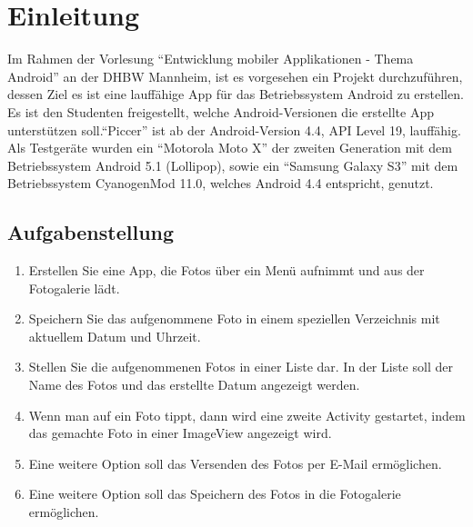 
\chapter{Einleitung}


Im Rahmen der Vorlesung \enquote{Entwicklung mobiler Applikationen - Thema Android} an der DHBW Mannheim, ist es vorgesehen ein Projekt durchzuführen, dessen Ziel es ist eine lauffähige App für das Betriebssystem Android zu erstellen.
\\Es ist den Studenten freigestellt, welche Android-Versionen die erstellte App unterstützen soll.\enquote{Piccer} ist ab der Android-Version 4.4, API Level 19, lauffähig.
\\Als Testgeräte wurden ein \enquote{Motorola Moto X} der zweiten Generation mit dem Betriebssystem Android 5.1 (Lollipop), sowie ein \enquote{Samsung Galaxy S3} mit dem Betriebssystem CyanogenMod 11.0, welches Android 4.4 entspricht, genutzt.


\section{Aufgabenstellung}
\begin{enumerate}
\item Erstellen Sie eine App, die Fotos über ein Menü aufnimmt und aus der Fotogalerie lädt.
\item Speichern Sie das aufgenommene Foto in einem speziellen Verzeichnis mit aktuellem Datum und Uhrzeit.
\item Stellen Sie die aufgenommenen Fotos in einer Liste dar. In der Liste soll der Name des Fotos und das erstellte Datum angezeigt werden.
\item Wenn man auf ein Foto tippt, dann wird eine zweite Activity gestartet, indem das gemachte Foto in einer ImageView angezeigt wird.
\item Eine weitere Option soll das Versenden des Fotos per E-Mail ermöglichen.
\item Eine weitere Option soll das Speichern des Fotos in die Fotogalerie ermöglichen.
\end{enumerate}

\newpage

